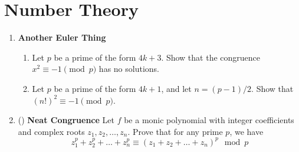\documentclass[11pt]{scrartcl}
\begin{document}
\section{Number Theory}
\begin{enumerate}[label=\textbf{N\arabic*}.]
    \item \textbf{Another Euler Thing}
    \begin{enumerate}
        \item Let $p$ be a prime of the form $4k + 3$. Show that the congruence $x^2 \equiv -1 \pmod{p}$ has no solutions.

        \item Let $p$ be a prime of the form $4k + 1$, and let $n = (p - 1)/2$. Show that $(n!)^2 \equiv -1 \pmod{p}$.
    \end{enumerate}
    
    \item (\fullchili) \textbf{Neat Congruence} \newline
    Let $f$ be a monic polynomial with integer coefficients and complex roots $z_1, z_2, \dots, z_n$. Prove that for any prime $p$, we have \[ z_1^p + z_2^p + \dots + z_n^p \equiv (z_1 + z_2 + \dots + z_n)^p \mod{p} \]
\end{enumerate}
\end{document}
